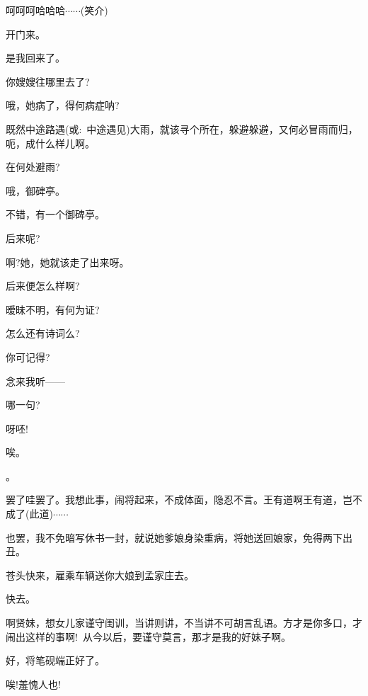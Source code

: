 {{呵呵呵哈哈哈$\cdots{}\cdots{}$({\hwfs 笑介})}


{开门来。}

{是我回来了。}


{你嫂嫂往哪里去了?}

{哦，她病了，得何病症呐?}

{既然中途路遇({\akai 或}:~中途遇见)大雨，就该寻个所在，躲避躲避，又何必冒雨而归，呃，成什么样儿啊。}

{在何处避雨?}

{哦，御碑亭。}

{不错，有一个御碑亭。}

{后来呢?}

{啊?她，她就该走了出来呀。}

{后来便怎么样啊?}

{暧昧不明，有何为证?}

{怎么还有诗词么?}

{你可记得?}

{念来我听------}

{哪一句?}

{呀呸!}


{唉。}

。

{罢了哇罢了。我想此事，闹将起来，不成体面，隐忍不言。王有道啊王有道，岂不成了(此道)$\cdots{}\cdots{}$}

{也罢，我不免暗写休书一封，就说她爹娘身染重病，将她送回娘家，免得两下出丑。}

{苍头快来，雇乘车辆送你大娘到孟家庄去。}

{快去。}

{啊贤妹，想女儿家谨守闺训，当讲则讲，不当讲不可胡言乱语。方才是你多口，才闹出这样的事啊!~从今以后，要谨守莫言，那才是我的好妹子啊。}

{好，将笔砚端正好了。}

{唉!羞愧人也!}


}
